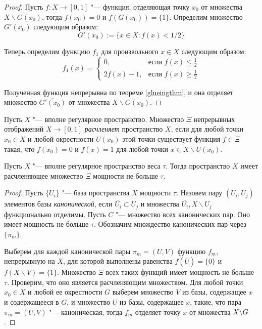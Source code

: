 \begin{proof}
    Пусть $f : X \to [0, 1]$ "--- функция, отделяющая точку $x_0$ от множества $X \backslash G(x_0)$, тогда $f(x_0) = 0$ и $f(G(x_0)) = \{1\}$. Определим множество $G'(x_0)$ следующим образом:
    \[G'(x_0) := \lbrace x \in X: f(x)<1/2\rbrace\]
    
    Теперь определим функцию $f_1$ для произвольного $x \in X$ следующим образом:
    \[
        f_1(x) =\begin{cases}
            0, & \text{если }f(x) \le \frac12\\
            2f(x) - 1, & \text{если }f(x) \ge \frac12
        \end{cases}
    \]
    
    Полученная функция непрерывна по теореме \ref{glueingthm}, и она отделяет множество $\overline{G'(x_0)}$ от множества $X\backslash G(x_0)$.
\end{proof}

\begin{definition}
    Пусть $X$ "--- вполне регулярное пространство. Множество $\Xi$ непрерывных отображений $X \rightarrow [0, 1]$ \textit{расчленяет} пространство $X$, если для любой точки $x_0 \in X$ и любой окрестности $U(x_0)$ этой точки существует функция $f \in \Xi$ такая, что $f(x_0) = 0$ и $f(x) = 1$ для любой точки $x \in X \backslash U(x_0)$.
\end{definition}

\begin{proposition}\label{thm2prop1}
    Пусть $X$ "--- вполне регулярное пространство веса $\tau$. Тогда пространство $X$ имеет расчленяющее множество $\Xi$ мощности не больше $\tau$.
\end{proposition}

\begin{proof}
    Пусть $\lbrace U_i\rbrace$ "--- база пространства $X$ мощности $\tau$. Назовем пару $(U_i, U_j)$ элементов базы \textit{канонической}, если $\overline{U_i} \subset U_j$ и множества $\overline{U_i}, X \backslash U_j$ функционально отделимы. Пусть $C$ "--- множество всех канонических пар. Оно имеет мощность не больше $\tau$. Обозначим множдество канонических пар через $\{\pi_m\}$.
    
    Выберем для каждой канонической пары $\pi_m = (U, V)$ функцию $f_m$, непрерывную на $X$, для которой выполнены равенства $f(\overline{U}) = \{0\}$ и $f(X\backslash V) = \{1\}$. Множество $\Xi$ всех таких функций имеет мощность не больше $\tau$. Проверим, что оно является расчленяющим множеством. Для любой точки $x_0 \in X$ и любой ее окрестности $G$ выберем множество $V$ из базы, содержащее $x$ и содержащееся в $G$, и множество $U$ из базы, содержащее $x$, такие, что пара $\pi_m = (U, V)$ "--- каноническая, тогда $f_m$ отделяет точку $x$ от множества $X \backslash G$.
\end{proof}

